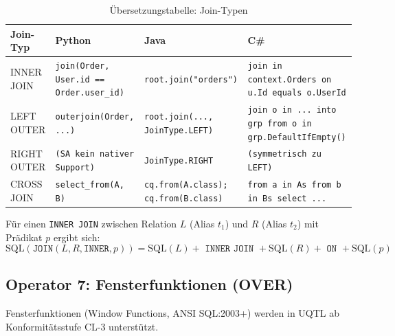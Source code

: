 \begin{table}
\centering
\caption{Übersetzungstabelle: Join-Typen}
\label{tab:join_ops}
\renewcommand{\arraystretch}{1.4}
\begin{tabularx}{\textwidth}{lXXX}
\toprule
\textbf{Join-Typ} & \textbf{Python} & \textbf{Java} & \textbf{C\#} \\
\midrule
INNER JOIN
  & \texttt{join(Order, User.id == Order.user\_id)}
  & \texttt{root.join("orders")}
  & \texttt{join in context.Orders on u.Id equals o.UserId} \\
LEFT OUTER
  & \texttt{outerjoin(Order, ...)}
  & \texttt{root.join(..., JoinType.LEFT)}
  & \texttt{join o in ... into grp from o in grp.DefaultIfEmpty()} \\
RIGHT OUTER
  & \texttt{(SA kein nativer Support)}
  & \texttt{JoinType.RIGHT}
  & \texttt{(symmetrisch zu LEFT)} \\
CROSS JOIN
  & \texttt{select\_from(A, B)}
  & \texttt{cq.from(A.class); cq.from(B.class)}
  & \texttt{from a in As from b in Bs select ...} \\
\bottomrule
\end{tabularx}
\end{table}

\begin{regel}
\label{regel:join}
Für einen \texttt{INNER JOIN} zwischen Relation $L$ (Alias $t_1$) und $R$ (Alias $t_2$)
mit Prädikat $p$ ergibt sich:
\[
\mathrm{SQL}(\mathtt{JOIN}(L, R, \mathtt{INNER}, p)) =
  \mathrm{SQL}(L) + \texttt{ INNER JOIN } + \mathrm{SQL}(R) +
  \texttt{ ON } + \mathrm{SQL}(p)
\]
\end{regel}

\subsection{Operator 7: Fensterfunktionen (OVER)}
\label{subsec:op_window}

Fensterfunktionen (Window Functions, ANSI SQL:2003+) werden in UQTL ab
Konformitätsstufe CL-3 unterstützt.

